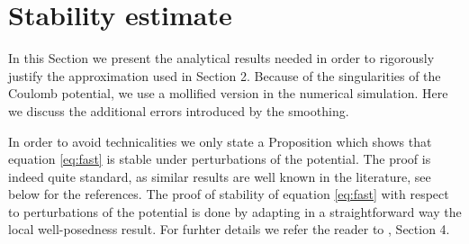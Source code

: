 \documentclass[10pt, leqno]{amsart}
\begin{document}
\section{Stability estimate}\label{anal:sect}
In this Section we present the analytical results needed in order to rigorously justify the approximation used in Section 2. Because of the singularities of the Coulomb potential, we use a mollified version in the numerical simulation. Here we discuss the additional errors introduced by the smoothing.

In order to avoid technicalities we only state a Proposition which shows that equation \eqref{eq:fast} is stable under perturbations of the potential. The proof is indeed quite standard, as similar results are well known in the literature, see below for the references.
The proof of stability of equation \eqref{eq:fast} with respect to perturbations of the potential is done by adapting in a straightforward way the local well-posedness result. For furhter details we refer the reader to \cite{Kato87}, \cite{Caz} Section 4.
\end{document}
